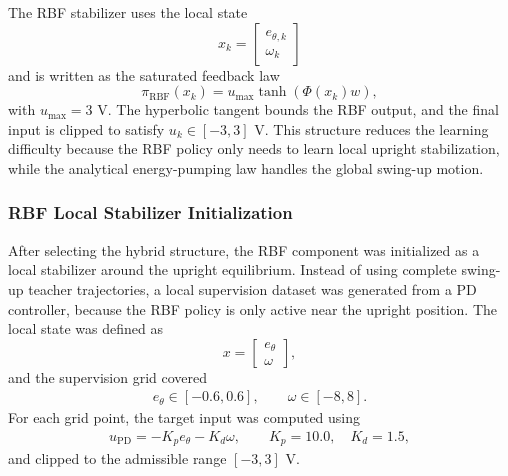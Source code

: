 The RBF stabilizer uses the local state
\begin{equation}
    x_k =
    \begin{bmatrix}
        e_{\theta,k} \\
        \omega_k
    \end{bmatrix}
\label{eq:hybrid_local_state}
\end{equation}
and is written as the saturated feedback law
\begin{equation}
    \pi_{\mathrm{RBF}}(x_k)
    =
    u_{\max}\tanh\!\left(\Phi(x_k)w\right),
\label{eq:rbf_policy}
\end{equation}
with \(u_{\max}=3\) V. The hyperbolic tangent bounds the RBF output, and the
final input is clipped to satisfy \(u_k\in[-3,3]\) V. This structure reduces the
learning difficulty because the RBF policy only needs to learn local upright
stabilization, while the analytical energy-pumping law handles the global
swing-up motion.


\subsubsection{RBF Local Stabilizer Initialization}

After selecting the hybrid structure, the RBF component was initialized as a
local stabilizer around the upright equilibrium. Instead of using complete
swing-up teacher trajectories, a local supervision dataset was generated from a
PD controller, because the RBF policy is only active near the upright position.
The local state was defined as
\begin{equation}
    x =
    \begin{bmatrix}
        e_\theta \\
        \omega
    \end{bmatrix},
\label{eq:rbf_training_state}
\end{equation}
and the supervision grid covered
\begin{equation}
\begin{aligned}
    e_\theta \in [-0.6,0.6],
    \qquad
    \omega \in [-8,8].
\end{aligned}
\label{eq:rbf_training_grid}
\end{equation}
For each grid point, the target input was computed using
\begin{equation}
\begin{aligned}
    u_{\mathrm{PD}} = -K_p e_\theta - K_d \omega,
    \qquad
    K_p=10.0,\quad K_d=1.5,
\end{aligned}
\label{eq:rbf_pd_target}
\end{equation}
and clipped to the admissible range \([-3,3]\) V.

